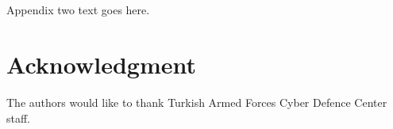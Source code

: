 \documentclass[journal]{IEEEtran}
\begin{document}
\section{}
Appendix two text goes here.


\section*{Acknowledgment}


The authors would like to thank Turkish Armed Forces Cyber Defence Center staff.
\ifCLASSOPTIONcaptionsoff
  \newpage
\fi





%
%
%




%
\end{document}

